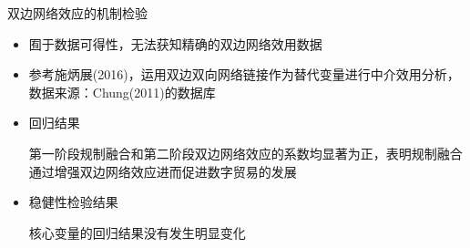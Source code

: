 \documentclass{beamer}
\newcommand{\zhhei}{\CJKfamily{zhhei}}  %
\begin{document}
\begin{frame}{双边网络效应的机制检验}
    \begin{itemize}
        \item 囿于数据可得性，无法获知精确的双边网络效用数据
        \item 参考施炳展(2016)，运用双边双向网络链接作为替代变量进行中介效用分析，数据来源：Chung(2011)的数据库
    \end{itemize}
    \begin{tcolorbox}[colback=lightyellow,colframe=deepblue,coltext=black]
        \begin{itemize}
            \item 回归结果 \\
            \begin{scriptsize}
                第一阶段规制融合和第二阶段双边网络效应的系数均显著为正，表明规制融合通过增强双边网络效应进而促进数字贸易的发展
            \end{scriptsize}
            \item 稳健性检验结果 \\
            \begin{scriptsize}
                核心变量的回归结果没有发生明显变化
            \end{scriptsize}
        \end{itemize}
    \end{tcolorbox}
\end{frame}
\end{document}
